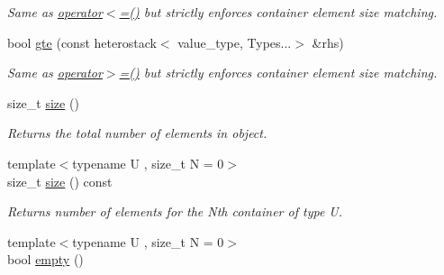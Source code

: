 \begin{DoxyCompactItemize}
\begin{DoxyCompactList}\small\item\em Same as \hyperlink{classheterogeneous_1_1heterostack_3_01_t_00_01_types_8_8_8_4_aed77b2868ab4a6e8ed672acff0b45796}{operator$<$=()} but strictly enforces container element size matching. \end{DoxyCompactList}\item 
\hypertarget{classheterogeneous_1_1heterostack_3_01_t_00_01_types_8_8_8_4_a1be87da6c6bfd64768491023928e2c0e}{}bool \hyperlink{classheterogeneous_1_1heterostack_3_01_t_00_01_types_8_8_8_4_a1be87da6c6bfd64768491023928e2c0e}{gte} (const heterostack$<$ value\+\_\+type, Types...$>$ \&rhs)\label{classheterogeneous_1_1heterostack_3_01_t_00_01_types_8_8_8_4_a1be87da6c6bfd64768491023928e2c0e}

\begin{DoxyCompactList}\small\item\em Same as \hyperlink{classheterogeneous_1_1heterostack_3_01_t_00_01_types_8_8_8_4_aa1e0aa75e5157bf9675f9665bea6a3ce}{operator$>$=()} but strictly enforces container element size matching. \end{DoxyCompactList}\item 
\hypertarget{classheterogeneous_1_1heterostack_3_01_t_00_01_types_8_8_8_4_a4913e868d37f556b44c7d127ae8d5399}{}size\+\_\+t \hyperlink{classheterogeneous_1_1heterostack_3_01_t_00_01_types_8_8_8_4_a4913e868d37f556b44c7d127ae8d5399}{size} ()\label{classheterogeneous_1_1heterostack_3_01_t_00_01_types_8_8_8_4_a4913e868d37f556b44c7d127ae8d5399}

\begin{DoxyCompactList}\small\item\em Returns the total number of elements in object. \end{DoxyCompactList}\item 
\hypertarget{classheterogeneous_1_1heterostack_3_01_t_00_01_types_8_8_8_4_a438a359e8b73a16216661d35a1b6af15}{}{\footnotesize template$<$typename U , size\+\_\+t N = 0$>$ }\\size\+\_\+t \hyperlink{classheterogeneous_1_1heterostack_3_01_t_00_01_types_8_8_8_4_a438a359e8b73a16216661d35a1b6af15}{size} () const \label{classheterogeneous_1_1heterostack_3_01_t_00_01_types_8_8_8_4_a438a359e8b73a16216661d35a1b6af15}

\begin{DoxyCompactList}\small\item\em Returns number of elements for the Nth container of type U. \end{DoxyCompactList}\item 
\hypertarget{classheterogeneous_1_1heterostack_3_01_t_00_01_types_8_8_8_4_ac3edf367b072c1ceb7cccec027feafee}{}{\footnotesize template$<$typename U , size\+\_\+t N = 0$>$ }\\bool \hyperlink{classheterogeneous_1_1heterostack_3_01_t_00_01_types_8_8_8_4_ac3edf367b072c1ceb7cccec027feafee}{empty} ()\label{classheterogeneous_1_1heterostack_3_01_t_00_01_types_8_8_8_4_ac3edf367b072c1ceb7cccec027feafee}


\end{DoxyCompactItemize}
